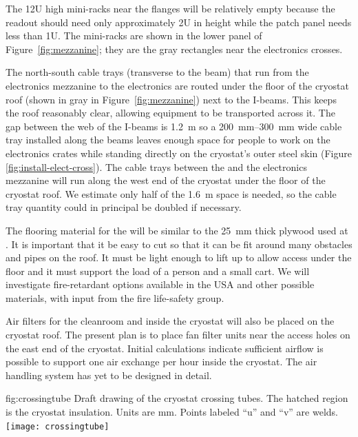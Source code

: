 The 12U high mini-racks near the \fdth flanges will be relatively empty because the  readout should need only approximately 2U in height while the  patch panel needs less than 1U. The mini-racks are shown in the lower panel of Figure~\ref{fig:mezzanine}; 
they are the gray rectangles near the electronics crosses.

The north-south cable trays (transverse to the beam) that run from the electronics mezzanine to the electronics \fdth are routed under the floor of the cryostat roof (shown in gray in Figure~\ref{fig:mezzanine}) next to the 
I-beams. 
This keeps the roof reasonably clear, allowing equipment to be transported across it. 
The gap between the web of the I-beams is \SI{1.2}{m} so 
a \SIrange{200}{300}{mm} wide cable tray installed along the beams 
leaves enough space for people to work on the electronics crates while standing directly on the cryostat's outer steel skin (Figure \ref{fig:install-elect-cross}). 
The cable trays between the  and the electronics mezzanine will run along the west end of the cryostat under the floor of the cryostat roof. 
We estimate only half of the \SI{1.6}{m} space is needed, so the cable tray quantity could in principal be doubled if necessary. 

The flooring material for the 
will be similar to the \SI{25}{mm} thick plywood used at . 
It is important that it be easy to cut so that it can be fit around many obstacles and pipes on the roof. It must be light enough to lift up to allow access under the floor and it must support the load of a person and a small cart. 
We will investigate fire-retardant options available in the USA and other possible materials, with input from the  fire life-safety group. 

Air filters for the cleanroom and inside the cryostat will also be placed on the cryostat roof. The present plan is to place fan filter units near the %
access holes on the east end of the cryostat. Initial calculations indicate sufficient airflow is possible to support one air exchange per hour inside the cryostat. The air handling system has yet to be designed in detail.


\begin{dunefigure}{fig:crossingtube}
  {Draft drawing of the cryostat crossing tubes. The hatched region is the cryostat insulation. Units are mm. Points labeled ``u'' and ``v'' are welds. }
\texttt{[image: crossingtube]}
\end{dunefigure}
 
